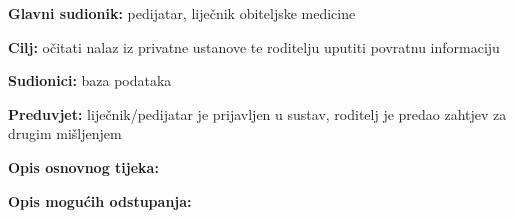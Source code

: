                     \noindent {}
					\begin{packed_item}
	
						\item \textbf{Glavni sudionik: }pedijatar, liječnik obiteljske medicine
						\item  \textbf{Cilj:} očitati nalaz iz privatne ustanove te roditelju uputiti povratnu informaciju 
						\item  \textbf{Sudionici:} baza podataka
						\item  \textbf{Preduvjet:} liječnik/pedijatar je prijavljen u sustav, roditelj je predao zahtjev za drugim mišljenjem
						\item  \textbf{Opis osnovnog tijeka:}
						
						\item[] \begin{packed_enum}
	
							\item 
							\item 
							\item 

						\end{packed_enum}
						
						\item  \textbf{Opis mogućih odstupanja:}
						
						\item[] \begin{packed_item}
	
							\item[2.a] 
							\item[] \begin{packed_enum}
								
								\item 
								\item 
							\end{packed_enum}
							
						\end{packed_item}
					\end{packed_item}

